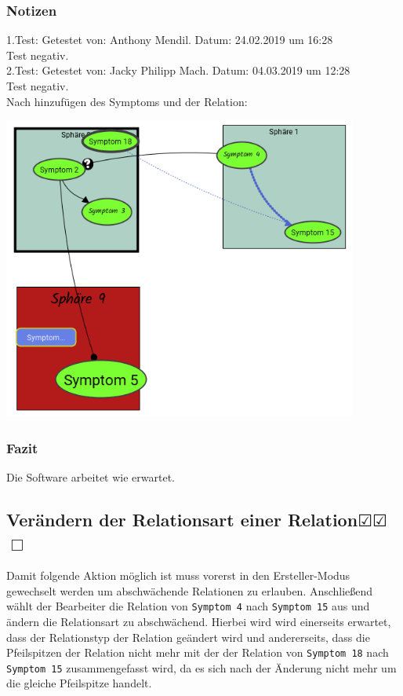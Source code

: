 \documentclass[enabledeprecatedfontcommands]{scrartcl}
\newcommand{\subsectiont}[2]{\subsection[#1]{#1{\normalsize\normalfont #2}}}
\newcommand{\leer}{$\Box$}
\newcommand{\ok}{$\CheckedBox$}
\begin{document}
\subsubsection{Notizen}
1.Test: Getestet von: Anthony Mendil. Datum: 24.02.2019 um 16:28 \\
Test negativ. \\
2.Test: Getestet von: Jacky Philipp Mach. Datum: 04.03.2019 um 12:28 \\
Test negativ.\\
Nach hinzufügen des Symptoms und der Relation: 
\begin{center}
\includegraphics[height=10cm]{3_35.PNG}
\end{center}
\subsubsection{Fazit}
Die Software arbeitet wie erwartet.

\subsectiont{Verändern der Relationsart einer Relation}{\dotfill\ok\ok\leer}
Damit folgende Aktion möglich ist muss vorerst in den Ersteller-Modus gewechselt werden um abschwächende Relationen zu erlauben. Anschließend wählt der Bearbeiter die Relation von \texttt{Symptom 4} nach \texttt{Symptom 15} aus und ändern die Relationsart zu abschwächend. Hierbei wird wird einerseits erwartet, dass der Relationstyp der Relation geändert wird und andererseits, dass die Pfeilspitzen der Relation nicht mehr mit der der Relation von \texttt{Symptom 18} nach \texttt{Symptom 15} zusammengefasst wird, da es sich nach der Änderung nicht mehr um die gleiche Pfeilspitze handelt.
\end{document}
